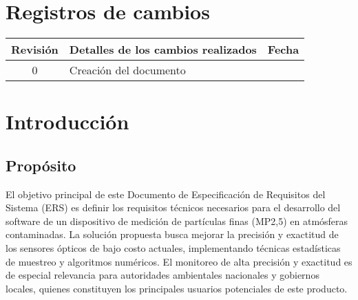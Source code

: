 \documentclass[
11pt, %
codirector, %
]{charter}
\begin{document}
\maketitle
\tableofcontents

\newpage

\section*{Registros de cambios}
\label{sec:registro}


\begin{table}[ht]
	\label{tab:registro}
	\centering
	\begin{tabularx}{\linewidth}{@{}|c|X|c|@{}}
		\hline
		\rowcolor[HTML]{C0C0C0} 
		Revisión & \multicolumn{1}{c|}{\cellcolor[HTML]{C0C0C0}Detalles de los cambios realizados} & Fecha      \\ \hline
		0      & Creación del documento                                 &\fechaInicioName \\ \hline
		\hline
		
	\end{tabularx}
	\label{sec:cierre}
\end{table}

\pagebreak


\section{Introducción}
\label{sec:org60390fa}



\subsection{Propósito}
\label{sec:org434c3ef}


El objetivo principal de este Documento de Especificación de Requisitos del Sistema (ERS) es definir los requisitos técnicos necesarios para el desarrollo del software de un dispositivo de medición de partículas finas (MP2,5) en atmósferas contaminadas. La solución propuesta busca mejorar la precisión y exactitud de los sensores ópticos de bajo costo actuales, implementando técnicas estadísticas de muestreo y algoritmos numéricos. El monitoreo de alta precisión y exactitud es de especial relevancia para autoridades ambientales nacionales y gobiernos locales, quienes constituyen los principales usuarios potenciales de este producto.
\end{document}
